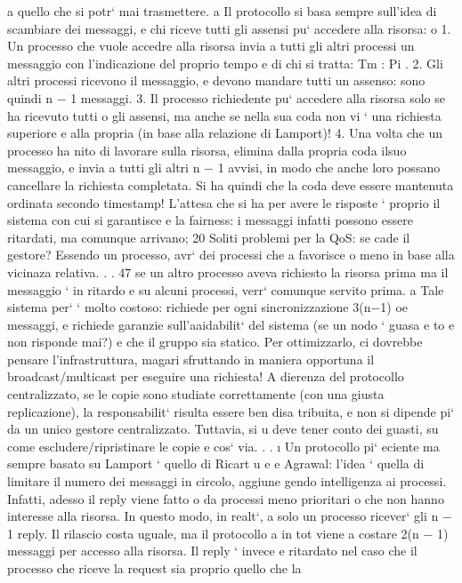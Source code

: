 \documentclass[a4paper,12pt]{article}
\begin{document}
a quello che si potr` mai trasmettere.
a
Il protocollo si basa sempre sull'idea di scambiare dei messaggi, e chi riceve tutti
gli assensi pu` accedere alla risorsa:
o
1. Un processo che vuole accedre alla risorsa invia a tutti gli altri processi un
messaggio con l'indicazione del proprio tempo e di chi si tratta: Tm : Pi .
2. Gli altri processi ricevono il messaggio, e devono mandare tutti un assenso:
sono quindi n $-$ 1 messaggi.
3. Il processo richiedente pu` accedere alla risorsa solo se ha ricevuto tutti
o
gli assensi, ma anche se nella sua coda non vi ` una richiesta superiore
e
alla propria (in base alla relazione di Lamport)!
4. Una volta che un processo ha nito di lavorare sulla risorsa, elimina dalla
propria coda ilsuo messaggio, e invia a tutti gli altri n $-$ 1 avvisi, in modo
che anche loro possano cancellare la richiesta completata.
Si ha quindi che la coda deve essere mantenuta ordinata secondo timestamp!
L'attesa che si ha per avere le risposte ` proprio il sistema con cui si garantisce
e
la fairness: i messaggi infatti possono essere ritardati, ma comunque arrivano;
20 Soliti problemi per la QoS: se cade il gestore? Essendo un processo, avr` dei processi che
a
favorisce o meno in base alla vicinaza relativa. . .
47
se un altro processo aveva richiesto la risorsa prima ma il messaggio ` in ritardo
e
su alcuni processi, verr` comunque servito prima.
a
Tale sistema per` ` molto costoso: richiede per ogni sincronizzazione 3(n$-$1)
oe
messaggi, e richiede garanzie sull'aaidabilit` del sistema (se un nodo ` guasa
e
to e non risponde mai?) e che il gruppo sia statico. Per ottimizzarlo, ci
dovrebbe pensare l'infrastruttura, magari sfruttando in maniera opportuna il
broadcast/multicast per eseguire una richiesta!
A dierenza del protocollo centralizzato, se le copie sono studiate correttamente (con una giusta replicazione), la
responsabilit` risulta essere ben disa
tribuita, e non si dipende pi` da un unico gestore centralizzato. Tuttavia, si
u
deve tener conto dei guasti, su come escludere/ripristinare le copie e cos` via. . .
\i{}
Un protocollo pi` eciente ma sempre basato su Lamport ` quello di Ricart
u
e
e Agrawal: l'idea ` quella di limitare il numero dei messaggi in circolo, aggiune
gendo intelligenza ai processi. Infatti, adesso il reply viene fatto o da processi
meno prioritari o che non hanno interesse alla risorsa. In questo modo, in realt`,
a
solo un processo ricever` gli n $-$ 1 reply. Il rilascio costa uguale, ma il protocollo
a
in tot viene a costare 2(n $-$ 1) messaggi per accesso alla risorsa. Il reply ` invece
e
ritardato nel caso che il processo che riceve la request sia proprio quello che la
\end{document}
